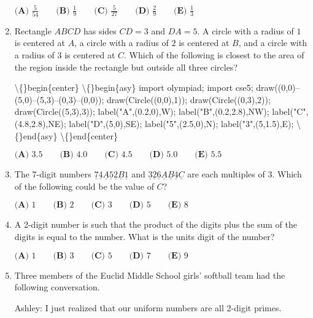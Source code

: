 \documentclass{article}
\begin{document}
\begin{enumerate}[label=\arabic*., itemsep=0.5em]
\( \textbf{(A) }\frac{5}{54}\qquad\textbf{(B) }\frac{1}{9}\qquad\textbf{(C) }\frac{5}{27}\qquad\textbf{(D) }\frac{2}{9}\qquad\textbf{(E) }\frac{1}{3} \)\par \vspace{0.5em}\item Rectangle \(ABCD\) has sides \(CD=3\) and \(DA=5\). A circle with a radius of \(1\) is centered at \(A\), a circle with a radius of \(2\) is centered at \(B\), and a circle with a radius of \(3\) is centered at \(C\). Which of the following is closest to the area of the region inside the rectangle but outside all three circles?

\textbackslash\{\}begin\{center\}
\textbackslash\{\}begin\{asy\}
import olympiad;
import cse5;
draw((0,0)--(5,0)--(5,3)--(0,3)--(0,0));
draw(Circle((0,0),1));
draw(Circle((0,3),2));
draw(Circle((5,3),3));
label("A",(0.2,0),W);
label("B",(0.2,2.8),NW);
label("C",(4.8,2.8),NE);
label("D",(5,0),SE);
label("5",(2.5,0),N);
label("3",(5,1.5),E);
\textbackslash\{\}end\{asy\}
\textbackslash\{\}end\{center\}


\( \textbf{(A) }3.5\qquad\textbf{(B) }4.0\qquad\textbf{(C) }4.5\qquad\textbf{(D) }5.0\qquad\textbf{(E) }5.5 \)\par \vspace{0.5em}\item The 7-digit numbers \(\underline{7} \underline{4} \underline{A} \underline{5} \underline{2} \underline{B} \underline{1}\) and \(\underline{3} \underline{2} \underline{6} \underline{A} \underline{B} \underline{4} \underline{C}\) are each multiples of 3. Which of the following could be the value of \(C\)?

\( \textbf{(A) }1\qquad\textbf{(B) }2\qquad\textbf{(C) }3\qquad\textbf{(D) }5\qquad\textbf{(E) }8 \)\par \vspace{0.5em}\item A 2-digit number is such that the product of the digits plus the sum of the digits is equal to the number. What is the units digit of the number?

\( \textbf{(A) }1\qquad\textbf{(B) }3\qquad\textbf{(C) }5\qquad\textbf{(D) }7\qquad\textbf{(E) }9 \)\par \vspace{0.5em}\item Three members of the Euclid Middle School girls' softball team had the following conversation.

Ashley: I just realized that our uniform numbers are all 2-digit primes.


\end{enumerate}
\end{document}
